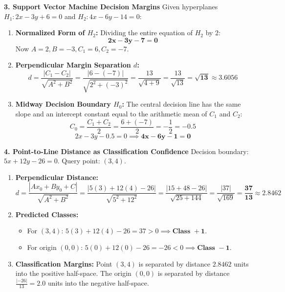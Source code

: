 \textbf{3. Support Vector Machine Decision Margins}
Given hyperplanes $H_1: 2x - 3y + 6 = 0$ and $H_2: 4x - 6y - 14 = 0$:
\begin{enumerate}
    \item \textbf{Normalized Form of $H_2$:}
    Dividing the entire equation of $H_2$ by $2$:
    $$\mathbf{2x - 3y - 7 = 0}$$
    Now $A = 2, B = -3, C_1 = 6, C_2 = -7$.
    \item \textbf{Perpendicular Margin Separation $d$:}
    $$d = \frac{|C_1 - C_2|}{\sqrt{A^2 + B^2}} = \frac{|6 - (-7)|}{\sqrt{2^2 + (-3)^2}} = \frac{13}{\sqrt{4 + 9}} = \frac{13}{\sqrt{13}} = \mathbf{\sqrt{13} \approx 3.6056}$$
    \item \textbf{Midway Decision Boundary $H_0$:}
    The central decision line has the same slope and an intercept constant equal to the arithmetic mean of $C_1$ and $C_2$:
    $$C_0 = \frac{C_1 + C_2}{2} = \frac{6 + (-7)}{2} = -\frac{1}{2} = -0.5$$
    $$2x - 3y - 0.5 = 0 \implies \mathbf{4x - 6y - 1 = 0}$$
\end{enumerate}

\textbf{4. Point-to-Line Distance as Classification Confidence}
Decision boundary: $5x + 12y - 26 = 0$. Query point: $(3, 4)$.
\begin{enumerate}
    \item \textbf{Perpendicular Distance:}
    $$d = \frac{|Ax_0 + By_0 + C|}{\sqrt{A^2 + B^2}} = \frac{|5(3) + 12(4) - 26|}{\sqrt{5^2 + 12^2}} = \frac{|15 + 48 - 26|}{\sqrt{25 + 144}} = \frac{|37|}{\sqrt{169}} = \mathbf{\frac{37}{13} \approx 2.8462}$$
    \item \textbf{Predicted Classes:}
    \begin{itemize}
        \item For $(3, 4)$: $5(3) + 12(4) - 26 = 37 > 0 \implies \mathbf{\text{Class } +1}$.
        \item For origin $(0, 0)$: $5(0) + 12(0) - 26 = -26 < 0 \implies \mathbf{\text{Class } -1}$.
    \end{itemize}
    \item \textbf{Classification Margins:}
    Point $(3, 4)$ is separated by distance $\mathbf{2.8462}$ units into the positive half-space. The origin $(0, 0)$ is separated by distance $\frac{|-26|}{13} = \mathbf{2.0}$ units into the negative half-space.
\end{enumerate}

